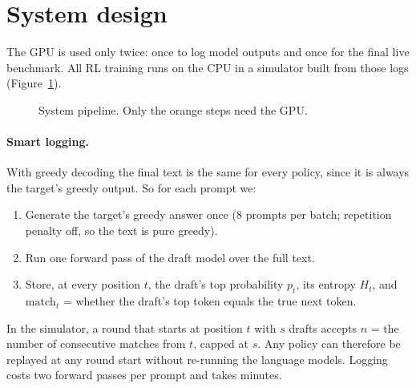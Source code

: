 \section{System design}

The GPU is used only twice: once to log model outputs and once for the final live benchmark. All RL training runs on the CPU in a simulator built from those logs (Figure~\ref{fig:pipeline}).

\begin{figure}[h]
\centering
{}
\caption{System pipeline. Only the orange steps need the GPU.}
\label{fig:pipeline}
\end{figure}

\paragraph{Smart logging.} With greedy decoding the final text is the same for every policy, since it is always the target's greedy output. So for each prompt we:
\begin{enumerate}
  \item Generate the target's greedy answer once (8 prompts per batch; repetition penalty off, so the text is pure greedy).
  \item Run one forward pass of the draft model over the full text.
  \item Store, at every position $t$, the draft's top probability $p_t$, its entropy $H_t$, and $\text{match}_t$ = whether the draft's top token equals the true next token.
\end{enumerate}
In the simulator, a round that starts at position $t$ with $s$ drafts accepts $n$ = the number of consecutive matches from $t$, capped at $s$. Any policy can therefore be replayed at any round start without re-running the language models. Logging costs two forward passes per prompt and takes minutes.

